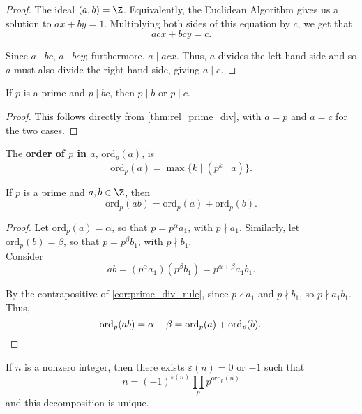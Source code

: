 \documentclass[11pt]{article}
\begin{document}
\begin{proof}
The ideal $(a, b) = \Z$. Equivalently, the Euclidean Algorithm gives us a solution to $ax + by = 1$. Multiplying both sides of this equation by $c$,
we get that
\[
    acx + bcy = c.
\]

Since $a \mid bc$, $a \mid bcy$; furthermore, $a \mid acx$. Thus, $a$ divides the left hand side and so $a$ must also divide the right hand side, giving $a \mid c$.
\end{proof}

\begin{corollary}\label{cor:prime_div_rule}
If $p$ is a prime and $p \mid bc$, then $p \mid b$ or $p \mid c$.
\end{corollary}

\begin{proof}
This follows directly from \cref{thm:rel_prime_div}, with $a = p$ and $a = c$ for the two cases.
\end{proof}

\begin{definition}[Order]
The \textbf{order of $p$ in $a$}, $\mathrm{ord}_p(a)$, is
\[
    \mathrm{ord}_p(a) = \max \{ k \mid (p^k \mid a) \}.
\] 
\end{definition}

\begin{corollary}
If $p$ is a prime and $a, b \in \Z$, then 
\[
    \mathrm{ord}_p(ab) = \mathrm{ord}_p(a) + \mathrm{ord}_p(b).   
\]    
\end{corollary}

\begin{proof}
Let $\mathrm{ord}_p(a) = \alpha$, so that $p = p^\alpha a_1$, with $p \nmid a_1$. 
Similarly, let $\mathrm{ord}_p(b) = \beta$, so that $p = p^\beta b_1$, with $p \nmid b_1$. \\

Consider 
\[
    ab = \left(p^\alpha a_1\right) \left( p^\beta b_1 \right)  = p^{\alpha + \beta} a_1b_1.
\]

By the contrapositive of \cref{cor:prime_div_rule}, since $p \nmid a_1$ and $p \nmid b_1$, so $p \nmid a_1b_1$. Thus, 
\[
    \mathrm{ord}_p(ab) = \alpha + \beta = \mathrm{ord}_p(a) + \mathrm{ord}_p(b). \, \qedhere
\]
\end{proof}

\begin{theorem}
If $n$ is a nonzero integer, then there exists $\varepsilon(n) = 0$ or $-1$ such that
\[
    n = (-1)^{\varepsilon(n)} \prod_p p^{\mathrm{ord}_p(n)}
\]
and this decomposition is unique.
\end{theorem}
\end{document}
